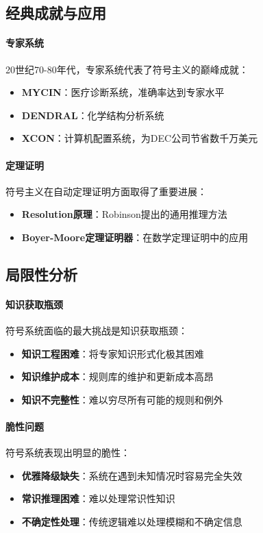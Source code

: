 \subsection{经典成就与应用}

\paragraph{专家系统}
20世纪70-80年代，专家系统代表了符号主义的巅峰成就：

\begin{itemize}
\item \textbf{MYCIN}：医疗诊断系统，准确率达到专家水平
\item \textbf{DENDRAL}：化学结构分析系统
\item \textbf{XCON}：计算机配置系统，为DEC公司节省数千万美元
\end{itemize}

\paragraph{定理证明}
符号主义在自动定理证明方面取得了重要进展：
\begin{itemize}
\item \textbf{Resolution原理}：Robinson提出的通用推理方法
\item \textbf{Boyer-Moore定理证明器}：在数学定理证明中的应用
\end{itemize}

\subsection{局限性分析}

\paragraph{知识获取瓶颈}
符号系统面临的最大挑战是知识获取瓶颈：
\begin{itemize}
\item \textbf{知识工程困难}：将专家知识形式化极其困难
\item \textbf{知识维护成本}：规则库的维护和更新成本高昂
\item \textbf{知识不完整性}：难以穷尽所有可能的规则和例外
\end{itemize}

\paragraph{脆性问题}
符号系统表现出明显的脆性：
\begin{itemize}
\item \textbf{优雅降级缺失}：系统在遇到未知情况时容易完全失效
\item \textbf{常识推理困难}：难以处理常识性知识
\item \textbf{不确定性处理}：传统逻辑难以处理模糊和不确定信息
\end{itemize}

